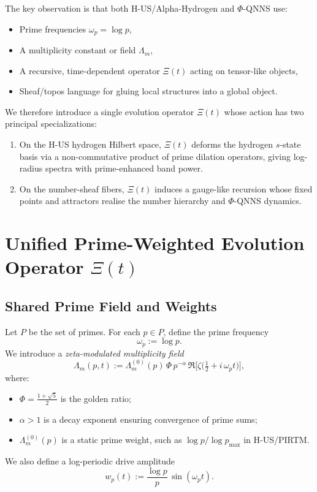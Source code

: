 \documentclass[11pt]{article}
\begin{document}
The key observation is that both H-US/Alpha-Hydrogen and $\Phi$-QNNS
use:
\begin{itemize}
  \item Prime frequencies $\omega_p = \log p$,
  \item A multiplicity constant or field $\Lambda_m$,
  \item A recursive, time-dependent operator $\Xi(t)$ acting on
  tensor-like objects,
  \item Sheaf/topos language for gluing local structures into a global
  object.
\end{itemize}
We therefore introduce a single evolution operator $\Xi(t)$ whose
action has two principal specializations:
\begin{enumerate}[label=\textbf{(\roman*)}]
  \item On the H-US hydrogen Hilbert space, $\Xi(t)$ deforms the
  hydrogen $s$-state basis via a non-commutative product of prime
  dilation operators, giving log-radius spectra with prime-enhanced
  band power.

  \item On the number-sheaf fibers, $\Xi(t)$ induces a gauge-like
  recursion whose fixed points and attractors realise the number
  hierarchy and $\Phi$-QNNS dynamics.
\end{enumerate}

\section{Unified Prime-Weighted Evolution Operator \texorpdfstring{$\Xi(t)$}{}}

\subsection{Shared Prime Field and Weights}

Let $P$ be the set of primes. For each $p \in P$, define the prime
frequency
\[
  \omega_p := \log p.
\]
We introduce a \emph{zeta-modulated multiplicity field}
\[
  \Lambda_m(p,t)
    := \Lambda_m^{(0)}(p)\,\Phi\,p^{-\alpha}
      \,\Re\bigl[\zeta\bigl(\tfrac12 + i\,\omega_p t\bigr)\bigr],
\]
where:
\begin{itemize}
  \item $\Phi = \frac{1+\sqrt{5}}{2}$ is the golden ratio;
  \item $\alpha > 1$ is a decay exponent ensuring convergence of prime
  sums;
  \item $\Lambda_m^{(0)}(p)$ is a static prime weight, such as
  $\log p / \log p_{\max}$ in H-US/PIRTM.
\end{itemize}
We also define a log-periodic drive amplitude
\[
  w_p(t) := \frac{\log p}{p}\,\sin(\omega_p t).
\]
\end{document}
